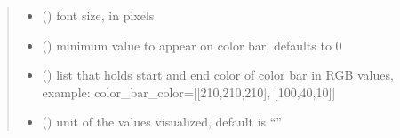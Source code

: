 \documentclass[letterpaper,10pt,english]{sphinxmanual}
\begin{document}
\begin{fulllineitems}
\begin{quote}
\begin{description}
\begin{itemize}
\item {} 
\sphinxAtStartPar
{} () \textendash{} font size, in pixels

\item {} 
\sphinxAtStartPar
{} () \textendash{} minimum value to appear on color bar, defaults to 0

\item {} 
\sphinxAtStartPar
{} (\sphinxstyleliteralemphasis{\sphinxupquote{{[}}}\sphinxstyleliteralemphasis{\sphinxupquote{{]}}}) \textendash{} list that holds start and end color of color bar in RGB values, example: color\_bar\_color={[}{[}210,210,210{]}, {[}100,40,10{]}{]}

\item {} 
\sphinxAtStartPar
{} () \textendash{} unit of the values visualized, default is “”

\end{itemize}

\end{description}\end{quote}

\begin{fulllineitems}
\label{\detokenize{index:sjvisualizer.WorldMap.world_map.draw}}
\pysigstartsignatures
{}
\pysigstopsignatures
\end{fulllineitems}


\begin{fulllineitems}
\label{\detokenize{index:sjvisualizer.WorldMap.world_map.update}}
\pysigstartsignatures
{}
\pysigstopsignatures
\end{fulllineitems}


\end{fulllineitems}
\end{document}
